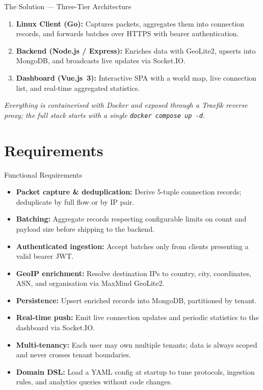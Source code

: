 \documentclass[aspectratio=169]{beamer}
\begin{document}
\begin{frame}{The Solution --- Three-Tier Architecture}
    \begin{enumerate}
        \item \textbf{Linux Client (Go):} Captures packets, aggregates them into connection
              records, and forwards batches over HTTPS with bearer authentication.
        \item \textbf{Backend (Node.js / Express):} Enriches data with GeoLite2, upserts
              into MongoDB, and broadcasts live updates via Socket.IO.
        \item \textbf{Dashboard (Vue.js~3):} Interactive SPA with a world map, live
              connection list, and real-time aggregated statistics.
    \end{enumerate}
    \vspace{0.4cm}
    \textit{Everything is containerised with Docker and exposed through a Traefik reverse
    proxy; the full stack starts with a single \texttt{docker compose up -d}.}
\end{frame}

\section{Requirements}

\begin{frame}{Functional Requirements}
    \begin{itemize}
        \item \textbf{Packet capture \& deduplication:} Derive 5-tuple connection records;
              deduplicate by full flow or by IP pair.
        \item \textbf{Batching:} Aggregate records respecting configurable limits on count
              and payload size before shipping to the backend.
        \item \textbf{Authenticated ingestion:} Accept batches only from clients presenting a
              valid bearer JWT.
        \item \textbf{GeoIP enrichment:} Resolve destination IPs to country, city,
              coordinates, ASN, and organisation via MaxMind GeoLite2.
        \item \textbf{Persistence:} Upsert enriched records into MongoDB, partitioned by
              tenant.
        \item \textbf{Real-time push:} Emit live connection updates and periodic statistics
              to the dashboard via Socket.IO.
        \item \textbf{Multi-tenancy:} Each user may own multiple tenants; data is always
              scoped and never crosses tenant boundaries.
        \item \textbf{Domain DSL:} Load a YAML config at startup to tune protocols,
              ingestion rules, and analytics queries without code changes.
    \end{itemize}
\end{frame}
\end{document}
